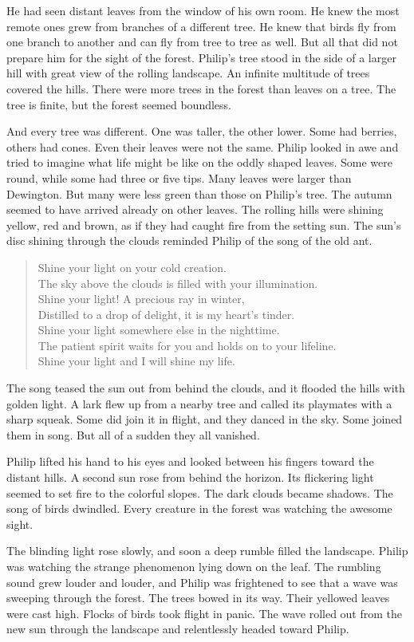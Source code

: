 \documentclass[10pt, draft]{memoir}
\newcommand{\sunsong}{
  Shine your light on your cold creation. \\
  The sky above the clouds is filled with your illumination. \\
  Shine your light! A precious ray in winter, \\
  Distilled to a drop of delight, it is my heart's tinder. \\
  Shine your light somewhere else in the nighttime. \\
  The patient spirit waits for you and holds on to your lifeline. \\
  Shine your light and I will shine my life.
}
\begin{document}
He had seen distant leaves from the window of his own room. He knew the most
remote ones grew from branches of a different tree. He knew that birds fly from
one branch to another and can fly from tree to tree as well. But all that did
not prepare him for the sight of the forest. Philip's tree stood in the side of
a larger hill with great view of the rolling landscape. An infinite multitude
of trees covered the hills. There were more trees in the forest than leaves on
a tree. The tree is finite, but the forest seemed boundless.

And every tree was different. One was taller, the other lower. Some had
berries, others had cones. Even their leaves were not the same. Philip looked
in awe and tried to imagine what life might be like on the oddly shaped leaves.
Some were round, while some had three or five tips. Many leaves were larger
than Dewington. But many were less green than those on Philip's tree. The
autumn seemed to have arrived already on other leaves. The rolling hills were
shining yellow, red and brown, as if they had caught fire from the setting sun.
The sun's disc shining through the clouds reminded Philip of the song of the
old ant.


\begin{verse}
\sunsong
\end{verse}


The song teased the sun out from behind the clouds, and it flooded the hills
with golden light. A lark flew up from a nearby tree and called its playmates
with a sharp squeak. Some did join it in flight, and they danced in the sky.
Some joined them in song. But all of a sudden they all vanished.

Philip lifted his hand to his eyes and looked between his fingers toward the
distant hills. A second sun rose from behind the horizon. Its flickering light
seemed to set fire to the colorful slopes. The dark clouds became shadows. The
song of birds dwindled. Every creature in the forest was watching the awesome
sight.

The blinding light rose slowly, and soon a deep rumble filled the landscape.
Philip was watching the strange phenomenon lying down on the leaf. The rumbling
sound grew louder and louder, and Philip was frightened to see that a wave was
sweeping through the forest. The trees bowed in its way. Their yellowed leaves
were cast high. Flocks of birds took flight in panic. The wave rolled out from
the new sun through the landscape and relentlessly headed toward Philip.
\end{document}
